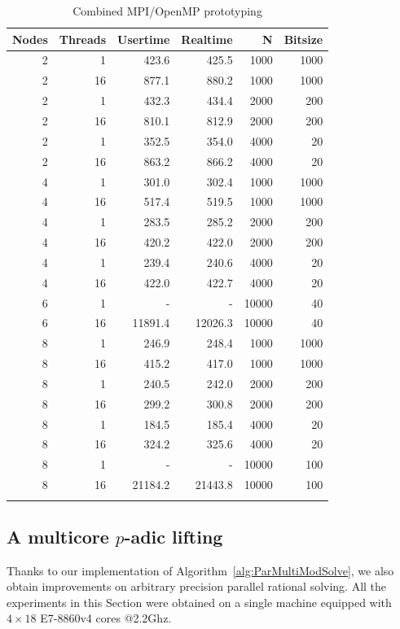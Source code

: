 \begin{table}[htb]
\renewcommand{\arraystretch}{1.1}
\begin{tabular}{rrrrrr}
\hline
 Nodes & Threads & Usertime & Realtime & N     & Bitsize\\
\hline
 2     & 1 & 423.6  & 425.5  & 1000  & 1000 \\
 2     & 16 & 877.1    & 880.2  & 1000  & 1000 \\
 2     & 1 & 432.3  & 434.4  & 2000  & 200  \\
 2     & 16 & 810.1  & 812.9  & 2000  & 200  \\
 2     & 1 & 352.5  & 354.0  & 4000  & 20   \\
 2     & 16 & 863.2  & 866.2  & 4000  & 20   \\
 4     & 1 & 301.0  & 302.4  & 1000  & 1000 \\
 4     & 16 & 517.4  & 519.5  & 1000  & 1000 \\
 4     & 1 & 283.5  & 285.2  & 2000  & 200  \\
 4     & 16 & 420.2  & 422.0  & 2000  & 200  \\
 4     & 1 & 239.4  & 240.6  & 4000  & 20   \\
 4     & 16 & 422.0  & 422.7  & 4000  & 20   \\
 6     & 1 &  - & -  & 10000 & 40   \\
 6     & 16 & 11891.4  & 12026.3  & 10000 & 40   \\
 8     & 1 & 246.9    & 248.4  & 1000  & 1000 \\
 8     & 16 & 415.2  & 417.0  & 1000  & 1000 \\
 8     & 1 & 240.5  & 242.0   & 2000  & 200  \\
 8     & 16 & 299.2  & 300.8  & 2000  & 200  \\
 8     & 1 & 184.5  & 185.4  & 4000  & 20   \\
 8     & 16 & 324.2  & 325.6  & 4000  & 20   \\
 8     & 1 &  - & -  & 10000 & 100  \\
 8     & 16 & 21184.2  & 21443.8  & 10000 & 100  \\
\hline
\vspace{0pt}
\end{tabular}
\caption{Combined MPI/OpenMP prototyping}\label{tab:HybridMPIOMP}
\end{table}


\subsection{A multicore $p$-adic lifting}
Thanks to our implementation of Algorithm~\ref{alg:ParMultiModSolve},
we also obtain improvements on arbitrary precision parallel rational
solving.
All the experiments in this Section were obtained on a single machine
equipped with $4{\times}18$ E7-8860v4 cores @2.2Ghz.


